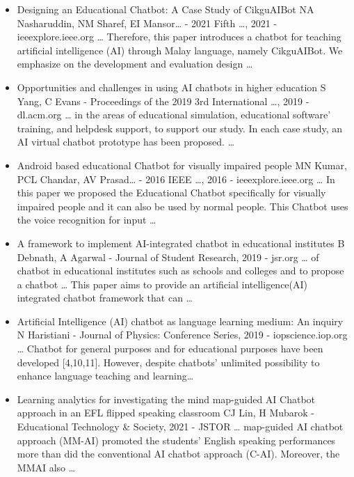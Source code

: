 \documentclass[14pt]{extarticle}
\begin{document}
\begin{itemize}
    \item Designing an Educational Chatbot: A Case Study of CikguAIBot
    NA Nasharuddin, NM Sharef, EI Mansor… - 2021 Fifth …, 2021 - ieeexplore.ieee.org
    … Therefore, this paper introduces a chatbot for teaching artificial intelligence (AI) through
    Malay language, namely CikguAIBot. We emphasize on the development and evaluation design …

    \item Opportunities and challenges in using AI chatbots in higher education
    S Yang, C Evans - Proceedings of the 2019 3rd International …, 2019 - dl.acm.org
    … in the areas of educational simulation, educational software’ training, and helpdesk support,
    to support our study. In each case study, an AI virtual chatbot prototype has been proposed. …

    \item Android based educational Chatbot for visually impaired people
    MN Kumar, PCL Chandar, AV Prasad… - 2016 IEEE …, 2016 - ieeexplore.ieee.org
    … In this paper we proposed the Educational Chatbot specifically for visually impaired people
    and it can also be used by normal people. This Chatbot uses the voice recognition for input …

    \item A framework to implement AI-integrated chatbot in educational institutes
    B Debnath, A Agarwal - Journal of Student Research, 2019 - jsr.org
    … of chatbot in educational institutes such as schools and colleges and to propose a chatbot
    … This paper aims to provide an artificial intelligence(AI) integrated chatbot framework that can …

    \item Artificial Intelligence (AI) chatbot as language learning medium: An inquiry
    N Haristiani - Journal of Physics: Conference Series, 2019 - iopscience.iop.org
    … Chatbot for general purposes and for educational purposes have been developed [4,10,11].
    However, despite chatbots’ unlimited possibility to enhance language teaching and learning…

    \newpage

    \item Learning analytics for investigating the mind map-guided AI Chatbot approach in an EFL flipped speaking classroom
    CJ Lin, H Mubarok - Educational Technology \& Society, 2021 - JSTOR
    … map-guided AI chatbot approach (MM-AI) promoted the students’ English speaking
    performances more than did the conventional AI chatbot approach (C-AI). Moreover, the MMAI also …


\end{itemize}
\end{document}
